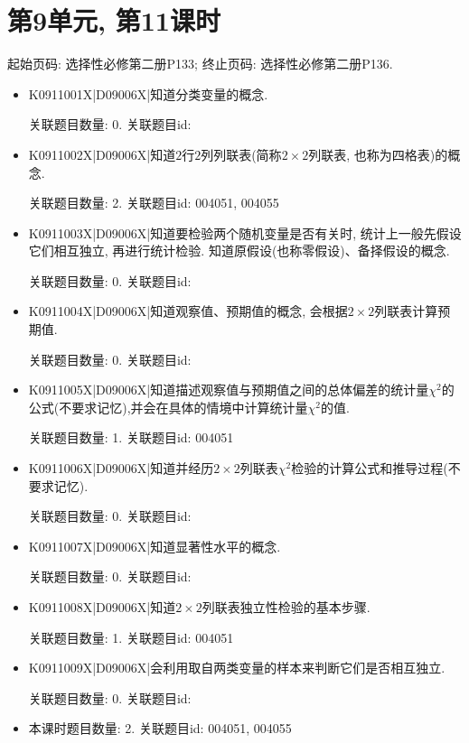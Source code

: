 \section*{第9单元, 第11课时}
起始页码: 选择性必修第二册P133; 终止页码: 选择性必修第二册P136.
\begin{itemize}
\item K0911001X|D09006X|知道分类变量的概念.

关联题目数量: 0. 关联题目id: 

\item K0911002X|D09006X|知道$2$行$2$列列联表(简称$2\times 2$列联表, 也称为四格表)的概念.

关联题目数量: 2. 关联题目id: 004051, 004055

\item K0911003X|D09006X|知道要检验两个随机变量是否有关时, 统计上一般先假设它们相互独立, 再进行统计检验. 知道原假设(也称零假设)、备择假设的概念.

关联题目数量: 0. 关联题目id: 

\item K0911004X|D09006X|知道观察值、预期值的概念, 会根据$2\times 2$列联表计算预期值.

关联题目数量: 0. 关联题目id: 

\item K0911005X|D09006X|知道描述观察值与预期值之间的总体偏差的统计量$\chi^2$的公式(不要求记忆),并会在具体的情境中计算统计量$\chi^2$的值.

关联题目数量: 1. 关联题目id: 004051

\item K0911006X|D09006X|知道并经历$2\times 2$列联表$\chi^2$检验的计算公式和推导过程(不要求记忆).

关联题目数量: 0. 关联题目id: 

\item K0911007X|D09006X|知道显著性水平的概念.

关联题目数量: 0. 关联题目id: 

\item K0911008X|D09006X|知道$2\times 2$列联表独立性检验的基本步骤.

关联题目数量: 1. 关联题目id: 004051

\item K0911009X|D09006X|会利用取自两类变量的样本来判断它们是否相互独立.

关联题目数量: 0. 关联题目id: 

\item 本课时题目数量: 2. 关联题目id: 004051, 004055

\end{itemize}

